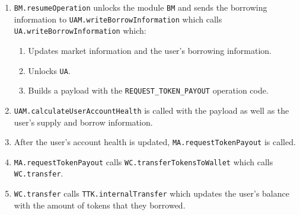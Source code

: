 \begin{enumerate}
  \item \verb|BM.resumeOperation| unlocks the module \verb|BM| and sends the borrowing information to \verb|UAM.writeBorrowInformation| which calls \verb|UA.writeBorrowInformation| which:
  \begin{enumerate}[label*=\arabic*.]
    \item Updates market information and the user's borrowing information.
    \item Unlocks \verb|UA|.
    \item Builds a payload with the \verb|REQUEST_TOKEN_PAYOUT| operation code.
  \end{enumerate}
  \item \verb|UAM.calculateUserAccountHealth| is called with the payload as well as the user's supply and borrow information.
  \item After the user's account health is updated, \verb|MA.requestTokenPayout| is called.
  \item \verb|MA.requestTokenPayout| calls \verb|WC.transferTokensToWallet| which calls \verb|WC.transfer|.
  \item \verb|WC.transfer| calls \verb|TTK.internalTransfer| which updates the user's balance with the amount of tokens that they borrowed.
\end{enumerate}


